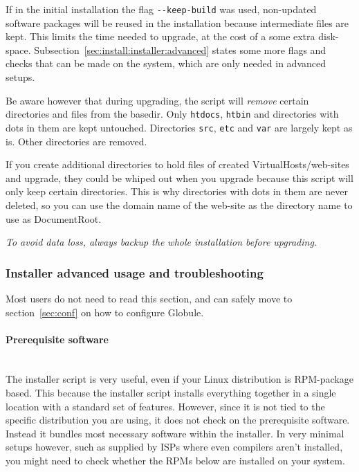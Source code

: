 \documentclass[10pt,a4paper]{article}
\makeatletter
\newenvironment{p}{\@open{P}{}}{\@close{P}}
\newenvironment{p}{}{\par}
\makeatother
\begin{document}
\begin{p}
If in the initial installation the flag \verb!--keep-build! was used,
non-updated software packages will be reused in the installation because
intermediate files are kept.  This limits the time needed to upgrade, at the
cost of a some extra disk-space.
Subsection~\ref{sec:install:installer:advanced} states some more flags and
checks that can be made on the system, which are only needed in advanced
setups.
\end{p}

\begin{p}
Be aware however that during upgrading, the script will \emph{remove} certain
directories and files from the basedir.  Only \texttt{htdocs}, \texttt{htbin}
and directories with dots in them are kept untouched.  Directories
\texttt{src}, \texttt{etc} and \texttt{var} are largely kept as is.  Other
directories are removed.
\end{p}

\begin{p}
If you create additional directories to hold files of created
VirtualHosts/web-sites and upgrade, they could be whiped out when you upgrade
because this script will only keep certain directories.  This is why
directories with dots in them are never deleted, so you can use the domain
name of the web-site as the directory name to use as DocumentRoot.
\end{p}

\begin{p}
\emph{To avoid data loss, always backup the whole installation before
upgrading.}
\end{p}

\subsubsection*{\label{sec:install:installer:advanced}
  Installer advanced usage and troubleshooting}

\begin{p}
Most users do not need to read this section, and can safely move to
section~\ref{sec:conf} on how to configure Globule.
\end{p}

\paragraph{Prerequisite software}~\\

\begin{p}
The installer script is very useful, even if your Linux distribution is
RPM-package based.  This because the installer script installs everything
together in a single location with a standard set of features.  However, since
it is not tied to the specific distribution you are using, it does not check
on the prerequisite software.  Instead it bundles most necessary software
within the installer.  In very minimal setups however, such as supplied by
ISPs where even compilers aren't installed, you might need to check whether
the RPMs below are installed on your system.
\end{p}
\end{document}
